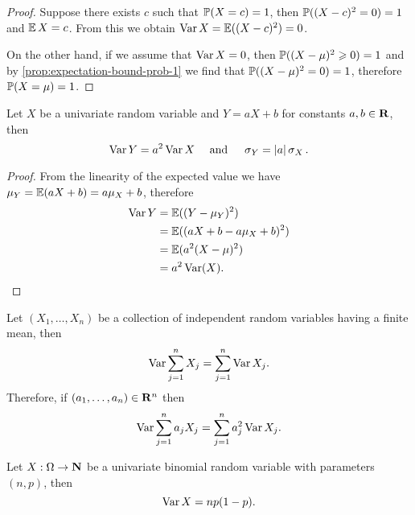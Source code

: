 \begin{proof}
    Suppose there exists \(c\) such that \(\operatorname{\mathbb{P}}(X = c) = 1\), then
    \(\operatorname{\mathbb{P}}((X - c)^2 = 0) = 1\) and \(\operatorname{\mathbb{E}} X = c\). From this we obtain
    \(\operatorname{Var} X = \operatorname{\mathbb{E}}((X - c)^2) = 0\).

    On the other hand, if we assume that \(\operatorname{Var} X = 0\), then
    \(\operatorname{\mathbb{P}}((X - \mu)^2 \geqslant 0) = 1\) and by \cref{prop:expectation-bound-prob-1} we find
    that \(\operatorname{\mathbb{P}}((X - \mu)^2 = 0) = 1\), therefore \(\operatorname{\mathbb{P}}(X = \mu) = 1\).
\end{proof}

\begin{proposition}
    \label{prop:variance-of-linear-combination}
    Let \(X\) be a univariate random variable and \(Y = a X + b\) for constants \(a,
    b \in \mathbf{R}\), then
    \[
        \operatorname{Var} Y = a^2 \operatorname{Var} X \quad \text{ and } \quad \operatorname{\sigma}_Y = |a| \operatorname{\sigma}_X.
    \]
\end{proposition}

\begin{proof}
    From the linearity of the expected value we have
    \(\mu_Y = \operatorname{\mathbb{E}}(a X + b) = a \mu_X + b\), therefore
    \begin{align*}
        \operatorname{Var} Y
         & = \operatorname{\mathbb{E}}((Y - \mu_Y)^2)             \\
         & = \operatorname{\mathbb{E}}((a X + b - a \mu_X + b)^2) \\
         & = \operatorname{\mathbb{E}}(a^2 (X - \mu)^2)           \\
         & = a^2 \operatorname{Var}(X).
    \end{align*}
\end{proof}

\begin{proposition}
    \label{prop:additivity-variance}
    Let \((X_1, \dots, X_n)\) be a collection of independent random variables having
    a finite mean, then
    \[
        \operatorname{Var} \sum_{j=1}^n X_j = \sum_{j=1}^n \operatorname{Var} X_j.
    \]
    Therefore, if \((a_1, \dots, a_n) \in \mathbf{R}^n\) then
    \[
        \operatorname{Var} \sum_{j=1}^n a_j X_j = \sum_{j=1}^n a_j^2 \operatorname{Var} X_j.
    \]
\end{proposition}

\begin{proposition}
    \label{prop:variance-binomial-random-variable}
    Let \(X: \Omega \to \mathbf{N}\) be a univariate binomial random variable with parameters
    \((n, p)\), then
    \[
        \operatorname{Var} X = n p (1 - p).
    \]
\end{proposition}

